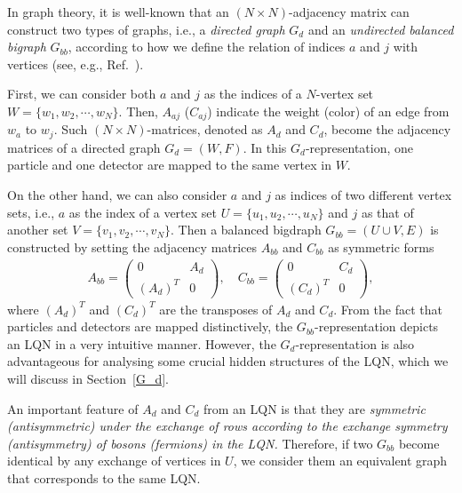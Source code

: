 \documentclass[a4paper,twocolumn,8pt,accepted=2021-12-15]{quantumarticle}
\begin{document}
	
	In graph theory, it is well-known that an $(N\times N)$-adjacency matrix can construct two types of graphs, i.e., a \emph{directed graph} $G_d$ and an \emph{undirected balanced bigraph} $G_{bb}$, according to how we define the relation of indices $a$ and $j$ with vertices (see, e.g., Ref.~\cite{brualdi1980bigraphs}). 
	
	First, we can consider both $a$ and $j$ as the indices of a $N$-vertex set $W =\{w_1,w_2,\cdots,w_N\}$. Then, $A_{aj}$ ($C_{aj}$) indicate the weight (color) of an edge from $w_a$ to $w_j$. Such $(N\times N)$-matrices, denoted as $A_d$ and $C_d$, become the adjacency matrices of a directed graph $G_d=(W,F)$. In this $G_{d}$-representation, one particle and one detector are mapped to the same vertex in $W$.
	
	On the other hand, we can also consider $a$ and $j$ as indices of two different vertex sets,  i.e., $a$ as the index of a vertex set $U =\{u_1,u_2,\cdots,u_N\}$ and  $j$ as that of another set $V =\{v_1,v_2,\cdots,v_N\}$. 
	Then a balanced bigdraph $G_{bb}=(U\cup V, E)$ is constructed by setting the adjacency matrices $A_{bb}$ and $C_{bb}$ as symmetric forms 
	\begin{align}\label{G_bb}
		A_{bb} = \begin{pmatrix}
			0 & A_{d}\\
			(A_{d})^T & 0 
		\end{pmatrix}, \quad
		C_{bb} = \begin{pmatrix}
			0 & C_{d}\\
			(C_{d})^T & 0 
		\end{pmatrix},
	\end{align} where $(A_d)^T$ and $(C_{d})^T$ are the transposes of $A_d$ and $C_d$.  %
	From the fact that particles and detectors are mapped distinctively, the $G_{bb}$-representation depicts an LQN in a very intuitive manner. However, the $G_d$-representation is also advantageous for analysing some crucial hidden structures of the LQN, which we will discuss in Section~\ref{G_d}. 
	
	An important feature of $A_d$ and $C_d$ from an LQN is that they are \emph{symmetric (antisymmetric) under the exchange of rows according to the exchange symmetry (antisymmetry) of bosons (fermions) in the LQN.} Therefore, if two $G_{bb}$ become identical by any exchange of vertices in $U$, we consider them an equivalent graph that corresponds to the same LQN.
	
\end{document}
